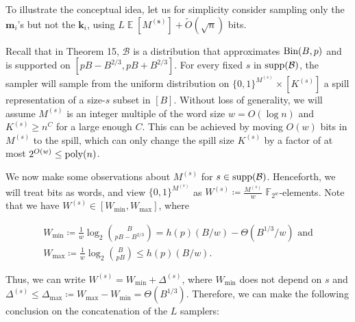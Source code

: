 \documentclass[10pt,a4paper]{article}
\begin{document}
To illustrate the conceptual idea, let us for simplicity consider sampling only the $\boldsymbol{m}_{i}$’s but not the $\boldsymbol{k}_{i}$, using $L\operatorname{\mathbb{E}}[M^{(\boldsymbol{s})}]+\widetilde{O}(\sqrt{n})$ bits.\par




Recall that in Theorem 15, $\mathcal{B}$ is a distribution that approximates $\textnormal{Bin}(B,p)$ and is supported on $[pB-B^{2/3},pB+B^{2/3}]$.
For every fixed $s$ in ${\rm supp}(\mathcal{B})$, the sampler will sample from the uniform distribution on $\{0,1\}^{M^{(s)}}\times[K^{(s)}]$ a spill representation of a size-$s$ subset in $[B]$.
Without loss of generality, we will assume $M^{(s)}$ is an integer multiple of the word size $w=O(\log n)$ and $K^{(s)}\geq n^{C}$ for a large enough $C$.
This can be achieved by moving $O(w)$ bits in $M^{(s)}$ to the spill, which can only change the spill size $K^{(s)}$ by a factor of at most $2^{O(w)}\leq\textnormal{poly}(n)$.\par




We now make some observations about $M^{(s)}$ for $s\in{\rm supp}(\mathcal{B})$.
Henceforth, we will treat bits as words, and view $\{0,1\}^{M^{(s)}}$ as $W^{(s)}\coloneq\tfrac{M^{(s)}}{w}$ $\mathbb{F}_{2^{w}}$-elements.
Note that we have $W^{(s)}\in[W_{\min},W_{\max}]$, where\par


\[\begin{gathered}
\displaystyle W_{\min} \displaystyle\coloneq\frac{1}{w}\log_{2}\binom{B}{pB-B^{2/3}}=h(p)(B/w)-\Theta(B^{1/3}/w)\text{ and} \\
\displaystyle W_{\max} \displaystyle\coloneq\frac{1}{w}\log_{2}\binom{B}{pB}\leq h(p)(B/w).
\end{gathered}\]


Thus, we can write $W^{(s)}=W_{\min}+\Delta^{(s)}$, where $W_{\min}$ does not depend on $s$ and $\Delta^{(s)}\leq\Delta_{\max}\coloneq W_{\max}-W_{\min}=\Theta(B^{1/3})$.
Therefore, we can make the following conclusion on the concatenation of the $L$ samplers:\par
\end{document}
